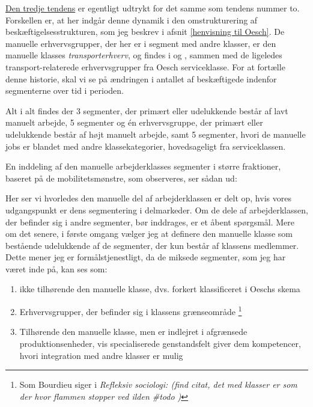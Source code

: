 \underline{Den tredje tendens} er egentligt udtrykt for det samme som tendens nummer to. Forskellen er, at her indgår denne dynamik i den omstrukturering af beskæftigelsesstrukturen, som jeg beskrev i afsnit \ref{henvisning til Oesch}.  De manuelle erhvervsgrupper, der her er i segment med andre klasser, er den manuelle klasses \emph{transporterhverv}, og findes i  og , sammen med de ligeledes transport-relaterede erhvervsgrupper fra Oesch serviceklasse. For at fortælle denne historie, skal vi se på ændringen i antallet af beskæftigede indenfor segmenterne over tid i perioden. 

Alt i alt findes der 3 segmenter, der primært eller udelukkende består af lavt manuelt arbejde, 5 segmenter og én erhvervsgruppe, der primært eller udelukkende består af højt manuelt arbejde, samt 5 segmenter, hvori de manuelle jobs er blandet med andre klassekategorier, hovedsageligt fra serviceklassen. 

En inddeling af den manuelle arbejderklasses segmenter i større fraktioner, baseret på de mobilitetsmønstre, som observeres, ser sådan ud: 

    
 
Her ser vi hvorledes den manuelle del af arbejderklassen er delt op, hvis vores udgangspunkt er dens segmentering i delmarkeder. Om de dele af arbejderklassen, der befinder sig i andre segmenter, bør inddrages, er et åbent spørgsmål. Mere om det senere, i første omgang vælger jeg at definere den manuelle klasse som bestående udelukkende af de segmenter, der kun består af klassens medlemmer. Dette mener jeg er formålstjenestligt, da de miksede segmenter, som jeg har været inde på, kan ses som:


%
\begin{enumerate}
 \itemsep -0.5em
   \item ikke tilhørende den manuelle klasse, dvs. forkert klassificeret i Oeschs skema
   \item Erhvervsgrupper, der befinder sig i klassens grænseområde%
       \footnote{ Som Bourdieu siger i \emph{Refleksiv sociologi: (find citat, det med klasser er som der hvor flammen stopper ved ilden \#todo )}}%
   \item Tilhørende den manuelle klasse, men er indlejret i afgrænsede produktionsenheder, vis specialiserede genstandsfelt giver dem kompetencer, hvori integration med andre klasser er mulig  
\end{enumerate}
%

